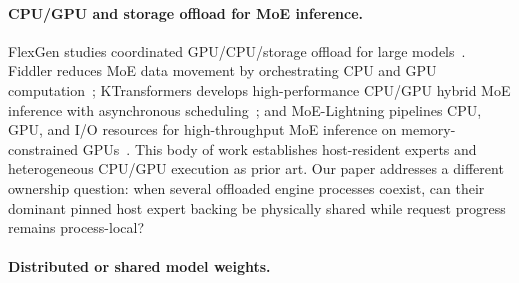 \paragraph{CPU/GPU and storage offload for MoE inference.}
FlexGen studies coordinated GPU/CPU/storage offload for large models~\cite{flexgen}. Fiddler reduces MoE data movement by orchestrating CPU and GPU computation~\cite{fiddler}; KTransformers develops high-performance CPU/GPU hybrid MoE inference with asynchronous scheduling~\cite{ktransformers}; and MoE-Lightning pipelines CPU, GPU, and I/O resources for high-throughput MoE inference on memory-constrained GPUs~\cite{moelightning}. This body of work establishes host-resident experts and heterogeneous CPU/GPU execution as prior art. Our paper addresses a different ownership question: when several offloaded engine processes coexist, can their dominant pinned host expert backing be physically shared while request progress remains process-local?

\paragraph{Distributed or shared model weights.}
